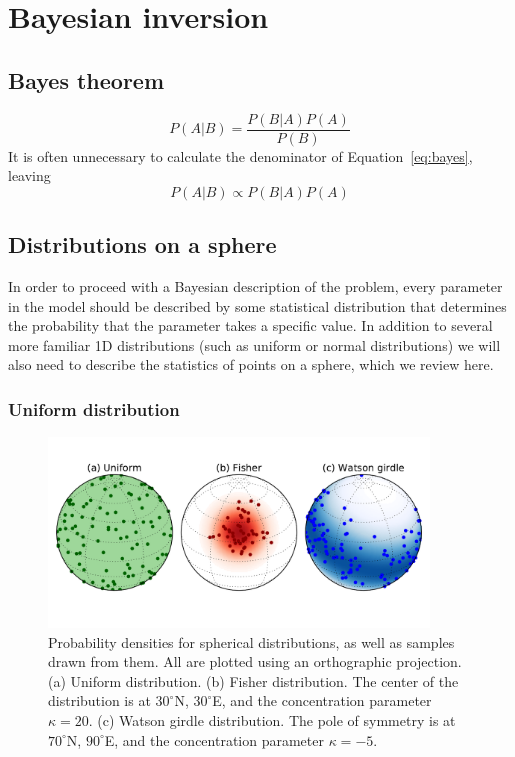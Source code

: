 \documentclass[preprint,12pt,authoryear]{elsarticle}
\begin{document}
\section{Bayesian inversion}
\label{sec:bayesian_inversion}
\subsection{Bayes theorem}

\begin{equation}
P\left(A \vert B \right) = \frac{ P \left(B \vert A \right) P \left(A\right) }{P \left(B\right)}
\label{eq:bayes}
\end{equation}
It is often unnecessary to calculate the denominator of Equation~\eqref{eq:bayes}, leaving
\begin{equation}
P\left(A \vert B \right) \propto P \left(B \vert A \right) P \left(A\right) 
\label{eq:propbayes}
\end{equation}
\subsection{Distributions on a sphere}

In order to proceed with a Bayesian description of the problem, every parameter
in the model should be described by some statistical distribution that determines
the probability that the parameter takes a specific value.
In addition to several more familiar 1D distributions (such as uniform or normal distributions)
we will also need to describe the statistics of points on a sphere, which we 
review here.


\subsubsection{Uniform distribution}
\begin{figure}
\includegraphics[width=0.9\textwidth]{figures/cartoon/distributions.pdf}
\caption[Spherical probability distributions.]{Probability densities for spherical distributions, as well as samples drawn from them. All are plotted using an orthographic projection. (a) Uniform distribution. (b) Fisher distribution. The center of the distribution is at $30^\circ$N, $30^\circ$E, and the concentration parameter $\kappa=20$. (c) Watson girdle distribution. The pole of symmetry is at $70^\circ$N, $90^\circ$E, and the concentration parameter $\kappa=-5$.}
\label{fig:distributions}
\end{figure}
\end{document}
